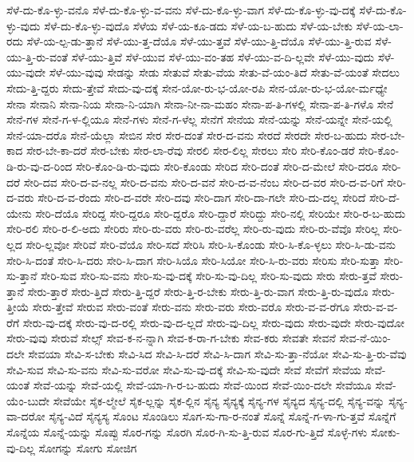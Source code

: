 {ಸೆಳೆ-ದು-ಕೊ-ಳ್ಳು-ವನೊ
ಸೆಳೆ-ದು-ಕೊ-ಳ್ಳು-ವ-ವನು
ಸೆಳೆ-ದು-ಕೊ-ಳ್ಳು-ವಾಗ
ಸೆಳೆ-ದು-ಕೊ-ಳ್ಳು-ವು-ದಕ್ಕೆ
ಸೆಳೆ-ದು-ಕೊ-ಳ್ಳು-ವುದು
ಸೆಳೆ-ದು-ಕೊ-ಳ್ಳು-ವುದೊ
ಸೆಳೆಯ
ಸೆಳೆ-ಯ-ಕೂ-ಡದು
ಸೆಳೆ-ಯ-ಬ-ಹುದು
ಸೆಳೆ-ಯ-ಬೇಕು
ಸೆಳೆ-ಯ-ಲಾ-ರದು
ಸೆಳೆ-ಯ-ಲ್ಪ-ಡು-ತ್ತಾನೆ
ಸೆಳೆ-ಯು-ತ್ತ-ದೆಯೊ
ಸೆಳೆ-ಯು-ತ್ತವೆ
ಸೆಳೆ-ಯು-ತ್ತಿ-ದೆಯೊ
ಸೆಳೆ-ಯು-ತ್ತಿ-ರುವ
ಸೆಳೆ-ಯು-ತ್ತಿ-ರು-ವಂತೆ
ಸೆಳೆ-ಯು-ತ್ತಿವೆ
ಸೆಳೆ-ಯುವ
ಸೆಳೆ-ಯು-ವಂ-ತಹ
ಸೆಳೆ-ಯು-ವ-ದಿ-ಲ್ಲವೇ
ಸೆಳೆ-ಯು-ವುದು
ಸೆಳೆ-ಯು-ವುದೇ
ಸೆಳೆ-ಯು-ವುವು
ಸೇಡನ್ನು
ಸೇಡು
ಸೇತುವೆ
ಸೇತು-ವೆಯ
ಸೇತು-ವೆ-ಯಂ-ತಿದೆ
ಸೇತು-ವೆ-ಯಂತೆ
ಸೇದಲು
ಸೇದು-ತ್ತಿ-ದ್ದರು
ಸೇದು-ತ್ತೇವೆ
ಸೇದು-ವು-ದಕ್ಕೆ
ಸೇನ-ಯೋ-ರು-ಭ-ಯೋ-ರಪಿ
ಸೇನ-ಯೋ-ರು-ಭ-ಯೋ-ರ್ಮಧ್ಯೇ
ಸೇನಾ
ಸೇನಾನಿ
ಸೇನಾ-ನಿಯ
ಸೇನಾ-ನಿ-ಯಾಗಿ
ಸೇನಾ-ನೀ-ನಾ-ಮಹಂ
ಸೇನಾ-ಪ-ತಿ-ಗಳಲ್ಲಿ
ಸೇನಾ-ಪ-ತಿ-ಗಳೊ
ಸೇನೆ
ಸೇನೆ-ಗಳ
ಸೇನೆ-ಗ-ಳ-ಲ್ಲಿಯೂ
ಸೇನೆ-ಗಳು
ಸೇನೆ-ಗ-ಳೆಲ್ಲ
ಸೇನೆಗೆ
ಸೇನೆಯ
ಸೇನೆ-ಯನ್ನು
ಸೇನೆ-ಯನ್ನೇ
ಸೇನೆ-ಯಲ್ಲಿ
ಸೇನೆ-ಯಾ-ದರೊ
ಸೇನೆ-ಯೆಲ್ಲಾ
ಸೇಬಿನ
ಸೇರ
ಸೇರ-ದಂತೆ
ಸೇರ-ದ-ವನು
ಸೇರದೆ
ಸೇರದೇ
ಸೇರ-ಬ-ಹುದು
ಸೇರ-ಬೇ-ಕಾದ
ಸೇರ-ಬೇ-ಕಾ-ದರೆ
ಸೇರ-ಬೇಕು
ಸೇರ-ಲಾ-ರೆವು
ಸೇರಲಿ
ಸೇರ-ಲಿಲ್ಲ
ಸೇರಲು
ಸೇರಿ
ಸೇರಿ-ಕೊಂ-ಡರೆ
ಸೇರಿ-ಕೊಂ-ಡಿ-ರು-ವು-ದ-ರಿಂದ
ಸೇರಿ-ಕೊಂ-ಡಿ-ರು-ವುದು
ಸೇರಿ-ಕೊಂಡು
ಸೇರಿದ
ಸೇರಿ-ದಂತೆ
ಸೇರಿ-ದ-ಮೇಲೆ
ಸೇರಿ-ದರೂ
ಸೇರಿ-ದರೆ
ಸೇರಿ-ದವ
ಸೇರಿ-ದ-ವ-ನಲ್ಲ
ಸೇರಿ-ದ-ವನು
ಸೇರಿ-ದ-ವನೆ
ಸೇರಿ-ದ-ವ-ನೆಂಬ
ಸೇರಿ-ದ-ವರ
ಸೇರಿ-ದ-ವ-ರಿಗೆ
ಸೇರಿ-ದ-ವರು
ಸೇರಿ-ದ-ವ-ರೆಂದು
ಸೇರಿ-ದ-ವರೇ
ಸೇರಿ-ದವು
ಸೇರಿ-ದಾಗ
ಸೇರಿ-ದಾ-ಗಲೇ
ಸೇರಿ-ದು-ದಲ್ಲ
ಸೇರಿದೆ
ಸೇರಿ-ದೆ-ಯೇನು
ಸೇರಿ-ದೆಯೊ
ಸೇರಿದ್ದ
ಸೇರಿ-ದ್ದರೂ
ಸೇರಿ-ದ್ದರೊ
ಸೇರಿ-ದ್ದಾರೆ
ಸೇರಿದ್ದು
ಸೇರಿ-ನಲ್ಲಿ
ಸೇರಿಯೇ
ಸೇರಿ-ರ-ಬ-ಹುದು
ಸೇರಿ-ರಲಿ
ಸೇರಿ-ರ-ಲಿ-ಅದು
ಸೇರಿರು
ಸೇರಿ-ರು-ವರು
ಸೇರಿ-ರು-ವರೆಲ್ಲ
ಸೇರಿ-ರು-ವುದು
ಸೇರಿ-ರು-ವೆವೊ
ಸೇರಿಲ್ಲ
ಸೇರಿ-ಲ್ಲದ
ಸೇರಿ-ಲ್ಲವೋ
ಸೇರಿವೆ
ಸೇರಿ-ವೆಯೊ
ಸೇರಿ-ಸದೆ
ಸೇರಿಸಿ
ಸೇರಿ-ಸಿ-ಕೊಂಡು
ಸೇರಿ-ಸಿ-ಕೊ-ಳ್ಳಲು
ಸೇರಿ-ಸಿ-ಡು-ವನು
ಸೇರಿ-ಸಿ-ದಂತೆ
ಸೇರಿ-ಸಿ-ದರು
ಸೇರಿ-ಸಿ-ದಾಗ
ಸೇರಿ-ಸಿಯೊ
ಸೇರಿ-ಸಿಯೋ
ಸೇರಿ-ಸಿ-ರು-ವರು
ಸೇರಿಸು
ಸೇರಿ-ಸುತ್ತಾ
ಸೇರಿ-ಸು-ತ್ತಾನೆ
ಸೇರಿ-ಸುವ
ಸೇರಿ-ಸು-ವನು
ಸೇರಿ-ಸು-ವು-ದಕ್ಕೆ
ಸೇರಿ-ಸು-ವು-ದಿಲ್ಲ
ಸೇರಿ-ಸು-ವುದು
ಸೇರು
ಸೇರು-ತ್ತವೆ
ಸೇರು-ತ್ತಾನೆ
ಸೇರು-ತ್ತಾರೆ
ಸೇರು-ತ್ತಿದೆ
ಸೇರು-ತ್ತಿ-ದ್ದರೆ
ಸೇರು-ತ್ತಿ-ರ-ಬೇಕು
ಸೇರು-ತ್ತಿ-ರು-ವಾಗ
ಸೇರು-ತ್ತಿ-ರು-ವುದೊ
ಸೇರು-ತ್ತೀಯೆ
ಸೇರು-ತ್ತೇವೆ
ಸೇರುವ
ಸೇರು-ವಂತೆ
ಸೇರು-ವನು
ಸೇರು-ವರು
ಸೇರು-ವರೊ
ಸೇರು-ವ-ವ-ರೆಗೂ
ಸೇರು-ವ-ವ-ರೆಗೆ
ಸೇರು-ವು-ದಕ್ಕೆ
ಸೇರು-ವು-ದ-ರಲ್ಲಿ
ಸೇರು-ವು-ದ-ಲ್ಲದೆ
ಸೇರು-ವು-ದಿಲ್ಲ
ಸೇರು-ವುದು
ಸೇರು-ವುದೇ
ಸೇರು-ವುದೋ
ಸೇರು-ವುವು
ಸೇರುವೆ
ಸೇಲ್ಸ್
ಸೇವ-ಕ-ನ-ನ್ನಾಗಿ
ಸೇವ-ಕ-ರಾ-ಗ-ಬೇಕು
ಸೇವ-ಕರು
ಸೇವತೇ
ಸೇವನೆ
ಸೇವ-ನೆ-ಯಿಂ-ದಲೇ
ಸೇವಯಾ
ಸೇವಿ-ಸ-ಬೇಕು
ಸೇವಿ-ಸಿದ
ಸೇವಿ-ಸಿ-ದರೆ
ಸೇವಿ-ಸಿ-ದಾಗ
ಸೇವಿ-ಸು-ತ್ತಾ-ನೆಯೋ
ಸೇವಿ-ಸು-ತ್ತಿ-ರು-ವೆವು
ಸೇವಿ-ಸುವ
ಸೇವಿ-ಸು-ವನು
ಸೇವಿ-ಸು-ವರೋ
ಸೇವಿ-ಸು-ವು-ದಕ್ಕೆ
ಸೇವಿ-ಸು-ವುದೇ
ಸೇವೆ
ಸೇವೆಗೆ
ಸೇವೆಯ
ಸೇವೆ-ಯಂತೆ
ಸೇವೆ-ಯನ್ನು
ಸೇವೆ-ಯಲ್ಲಿ
ಸೇವೆ-ಯಾ-ಗಿ-ರ-ಬ-ಹುದು
ಸೇವೆ-ಯಿಂದ
ಸೇವೆ-ಯಿಂ-ದಲೇ
ಸೇವೆಯೂ
ಸೇವೆ-ಯೆಂ-ಬುದೇ
ಸೇವೆಯೇ
ಸೈಕ-ಲ್ಮೇಲೆ
ಸೈಕ-ಲ್ಲನ್ನು
ಸೈಕ-ಲ್ಲಿನ
ಸೈನ್ಯ
ಸೈನ್ಯಕ್ಕೆ
ಸೈನ್ಯ-ಗಳ
ಸೈನ್ಯದ
ಸೈನ್ಯ-ದಲ್ಲಿ
ಸೈನ್ಯ-ವನ್ನು
ಸೈನ್ಯ-ವಾ-ದರೋ
ಸೈನ್ಯ-ವಿದೆ
ಸೈನ್ಯಸ್ಯ
ಸೊಂಟ
ಸೊಂಡಿಲು
ಸೊಗ-ಸು-ಗಾ-ರ-ನಂತೆ
ಸೊನ್ನೆ
ಸೊನ್ನೆ-ಗ-ಳಾ-ಗು-ತ್ತವೆ
ಸೊನ್ನೆಗೆ
ಸೊನ್ನೆಯ
ಸೊನ್ನೆ-ಯನ್ನು
ಸೊಪ್ಪು
ಸೊರ-ಗನ್ನು
ಸೊರಗಿ
ಸೊರ-ಗಿ-ಸು-ತ್ತಿ-ರುವ
ಸೊರ-ಗು-ತ್ತಿದೆ
ಸೊಳ್ಳೆ-ಗಳು
ಸೋಕು-ವು-ದಿಲ್ಲ
ಸೋಗನ್ನು
ಸೋಗು
ಸೋಜಿಗ
}
